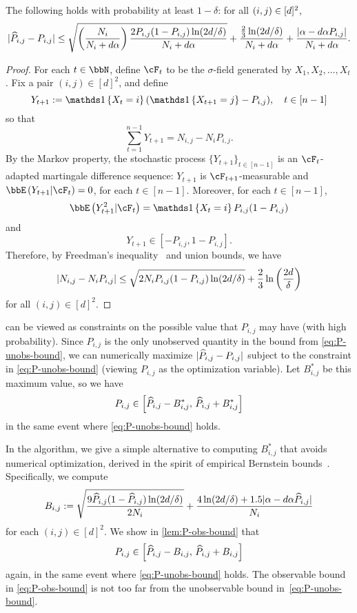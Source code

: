 \begin{lemma}
  \label{lem:P-unobs-bound}
  The following holds with probability at least $1-\delta$: for all
  $(i,j) \in [d]^2$,
  \begin{equation}
    | \widehat{P}_{i,j} - P_{i,j} |
    \leq
    \sqrt{\left(\frac{N_i}{N_i+d\alpha}\right)\frac{2P_{i,j}(1-P_{i,j})\ln(2d/\delta)}{N_i+d\alpha}}
    + \frac{\frac23\ln(2d/\delta)}{N_i+d\alpha}
    + \frac{|\alpha-d\alpha P_{i,j}|}{N_i+d\alpha}
    .
    \label{eq:P-unobs-bound}
  \end{equation}
\end{lemma}
\begin{proof}
  For each $t \in \bbN$, define $\cF_t$ to be the $\sigma$-field
  generated by $X_1,X_2,\dotsc,X_t$.
  Fix a pair $(i,j) \in [d]^2$, and define
  \[
    Y_{t+1} := \Ind{X_t = i} (\Ind{X_{t+1}=j} - P_{i,j})
    , \quad t \in [n-1]
  \]
  so that
  \[
    \sum_{t=1}^{n-1} Y_{t+1}
    = N_{i,j} - N_i P_{i,j}
    .
  \]
  By the Markov property, the stochastic process $\{ Y_{t+1} \}_{t \in
  [n-1]}$ is an $\cF_t$-adapted martingale difference sequence:
  $Y_{t+1}$ is $\cF_{t+1}$-measurable and $\EE{Y_{t+1}| \cF_t } = 0$,
  for each $t \in [n-1]$.
  Moreover, for each $t \in [n-1]$,
  \[
    \EE{Y_{t+1}^2| \cF_t } = \Ind{X_t=i} P_{i,j} (1-P_{i,j})
  \]
  and
  \[
    Y_{t+1} \in [-P_{i,j},1-P_{i,j}] .
  \]
  Therefore, by Freedman's inequality~\citep[Theorem 1.6]{Fre75} and
  union bounds, we have
  \[
    | N_{i,j} - N_i P_{i,j} |
    \leq \sqrt{2 N_i P_{i,j} (1-P_{i,j}) \ln(2d/\delta)} + \frac23
    \ln\left(\frac{2d}{\delta}\right)
  \]
  for all $(i,j) \in [d]^2$.
\end{proof}

 can be viewed as constraints on the possible
value that $P_{i,j}$ may have (with high probability).
Since $P_{i,j}$ is the only unobserved quantity in the bound from
\cref{eq:P-unobs-bound}, we can numerically maximize $|\widehat{P}_{i,j} -
P_{i,j}|$ subject to the constraint in \cref{eq:P-unobs-bound}
(viewing $P_{i,j}$ as the optimization variable).
Let $B_{i,j}^*$ be this maximum value, so we have
\[
  P_{i,j} \in
  \left[
    \widehat{P}_{i,j} - B_{i,j}^*,\,
    \widehat{P}_{i,j} + B_{i,j}^*
  \right]
\]
in the same event where \cref{eq:P-unobs-bound} holds.

In the algorithm, we give a simple alternative to computing
$B_{i,j}^*$ that avoids numerical optimization, derived in the spirit
of empirical Bernstein bounds~\citep{audibert2009}.
Specifically, we compute
\begin{equation}
  B_{i,j} :=
  \sqrt{\frac{9\widehat{P}_{i,j}(1-\widehat{P}_{i,j})\ln(2d/\delta)}{2N_i}}
  + \frac{4\ln(2d/\delta)+1.5|\alpha-d\alpha\widehat{P}_{i,j}|}{N_i}
  \label{eq:P-obs-bound}
\end{equation}
for each $(i,j) \in [d]^2$.
We show in \cref{lem:P-obs-bound} that
\[
  P_{i,j} \in
  \left[
    \widehat{P}_{i,j} - B_{i,j},\,
    \widehat{P}_{i,j} + B_{i,j}
  \right]
\]
again, in the same event where \cref{eq:P-unobs-bound} holds.
The observable bound in \cref{eq:P-obs-bound} is not too far from the
unobservable bound in~\cref{eq:P-unobs-bound}.


